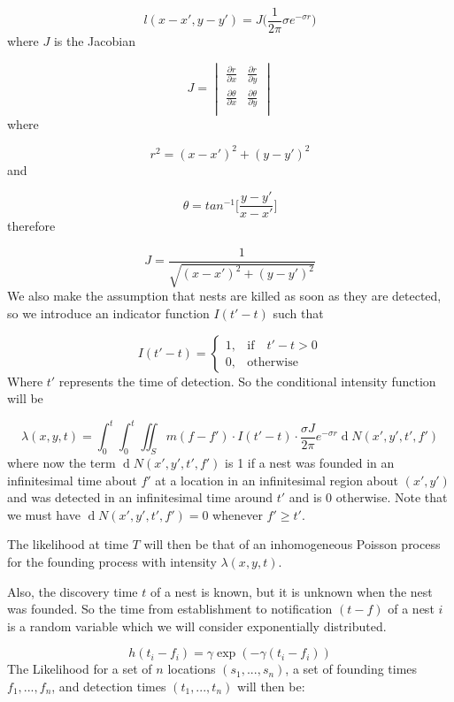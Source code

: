 \documentclass[11pt,a4paper]{article}
\renewcommand{\d}[1]{\ensuremath{\operatorname{d}\!{#1}}}
\begin{document}
\begin{equation}
l(x - x', y - y')= J \bigg(\frac{1}{2 \pi} \sigma e^{- \sigma r}\bigg)
\end{equation}
where $J$ is the Jacobian

\[
J =  
\begin{vmatrix}
	\frac{\partial r}{\partial x} & \frac{\partial r}{\partial y} \\
	\frac{\partial \theta}{\partial x} & \frac{\partial \theta}{\partial y} \\
\end{vmatrix}
\]
where

\[
r^{2} = (x - x')^{2} + (y - y')^{2}
\]
and

\[
\theta = tan^{-1} \Bigg [\frac{y - y'}{x - x'} \Bigg ]
\]
therefore

\[
J = \frac{1}{\sqrt{(x - x')^{2} + (y - y')^{2}}}
\]
We also make the assumption that nests are killed as soon as they are detected, so we introduce an indicator function $I(t' - t)$ such that

\[
I (t' - t) =
\begin{cases}
1, & \mbox{if} \quad t' -  t> 0 \\
0, & \mbox{otherwise}
\end{cases}
\]
Where $t'$ represents the time of detection. So the conditional intensity function will be

\[
\lambda(x, y, t) = \int_{0}^{t} \int_{0}^{t} \iint_{S} m(f - f') \cdot I(t' - t)\cdot \frac{\sigma J }{2 \pi} e^{- \sigma r} \d N(x',y',t',f')
\]
where now the term $\d N(x',y',t',f')$ is 1 if a nest was founded in an infinitesimal time about $f'$ at a location in an infinitesimal region about $(x', y')$ and was detected in an infinitesimal time around $t'$ and is $0$ otherwise. Note that we must have $\d N(x',y',t',f')=0$ whenever $f' \geq t'$.

The likelihood at time $T$ will then be that of  an inhomogeneous Poisson process for the founding process with intensity $\lambda(x, y, t)$.

Also, the discovery time $t$ of a nest is known, but it is unknown when the nest was founded. So the time from establishment to notification $(t - f)$ of a nest $i$ is a random variable which we will consider exponentially distributed.

\[
h(t_{i} - f_{i}) = \gamma \exp (- \gamma(t_{i} - f_{i}))
\]
The Likelihood for a set of $n$ locations $(s_{1}, ... , s_{n})$, a set of founding times $f_{1}, ... , f_{n}$, and detection times $(t_{1},  ... , t_{n})$ will then be:
\end{document}
